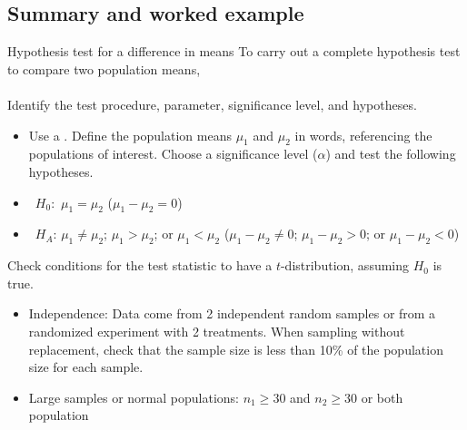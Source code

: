 \subsection[Summary and worked example]{Summary and worked example}
\begin{onebox}{Hypothesis test for a difference in means}
To carry out a complete hypothesis test to compare two population means,
\\
\\
 Identify the test procedure, parameter, significance level, and hypotheses.\vspace{-1mm}
\begin{itemize}
\item[] Use a .  Define the population means $\mu_1$ and  $\mu_2$ in words, referencing the populations of interest.  Choose a significance level ($\alpha$) and test the following hypotheses.
\end{itemize}
\begin{itemize}
\setlength{\itemsep}{0mm}
\item[] \quad \ $H_0$: \,$\mu_1 = \mu_2 $ \qquad  \qquad  \qquad  \qquad \qquad \quad \:  \: \: ($\mu_1 - \mu_2  =0$)
\item[] \quad \ $H_A$: $\mu_1\ne \mu_2 $; \; $\mu_1 > \mu_2 $; \; or \; $\mu_1 < \mu_2$ \qquad  ($\mu_1- \mu_2 \ne 0$; \; $\mu_1 - \mu_2 > 0$; \; or \; $\mu_1 - \mu_2 < 0$)
\end{itemize}
  Check conditions for the test statistic to have a $t$-distribution, assuming $H_0$ is true.  \vspace{-1mm}
{\setlength{\leftmargini}{13mm}
\begin{itemize}
\setlength{\itemsep}{0mm}
\item[1.] Independence:  Data come from 2 independent random samples or from a randomized 
experiment with 2 treatments.  When sampling without replacement, check that the  
sample size is less than 10\% of the population size for each sample.
\item[2.] Large samples or normal populations:  $n_1\ge 30$ and $n_2\ge 30$ or both population 

\end{itemize}}
\end{onebox}
